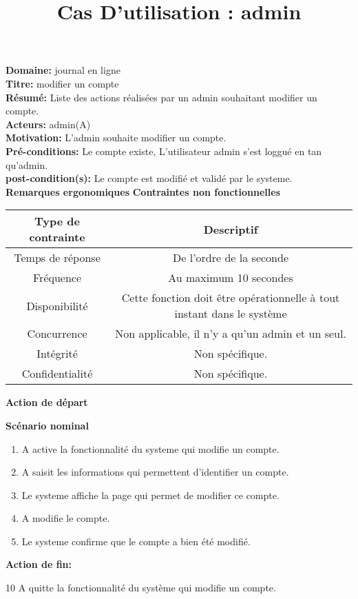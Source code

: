 \documentclass[a4paper,10pt]{article}
\title{Cas D'utilisation : admin}
\author{}
\begin{document}
\maketitle



\textbf{Domaine:} journal en ligne\\
\textbf{Titre:} modifier un compte\\
\textbf{Résumé:} Liste des actions réalisées par un admin souhaitant modifier un compte.\\
\textbf{Acteurs:} admin(A)\\
\textbf{Motivation:} L'admin souhaite modifier un compte.\\
\textbf{Pré-conditions:} Le compte existe, L'utilisateur admin s'est loggué en tan qu'admin.\\
\textbf{post-condition(s):} Le compte est modifié et validé par le systeme.\\



\textbf{Remarques ergonomiques}
\textbf{Contraintes non fonctionnelles}
\begin{center}
  \begin{tabular}{|c|c|}
\hline
   \textbf{Type de contrainte}&\textbf{Descriptif}\\
\hline
Temps de réponse&De l'ordre de la seconde\\
\hline
Fréquence & Au maximum 10 secondes\\
\hline
Disponibilité & Cette fonction doit être opérationnelle à tout instant dans le système\\
\hline
Concurrence&Non applicable, il n'y a qu'un admin et un seul.\\
\hline
Intégrité&Non spécifique.\\
\hline
Confidentialité& Non spécifique.\\
\hline

  \end{tabular}
\end{center}

\textbf{Action de départ}

\textbf{Scénario nominal}
\begin{enumerate}
\item A active la fonctionnalité du systeme qui modifie un compte.
\item A saisit les informations qui permettent d'identifier un compte.
\item Le systeme affiche la page qui permet de modifier ce compte.
\item A modifie le compte.
\item Le systeme confirme que le compte a bien été modifié.
\end{enumerate}

\textbf{Action de fin:}

10 A quitte la fonctionnalité du système qui modifie un compte.
\end{document}
